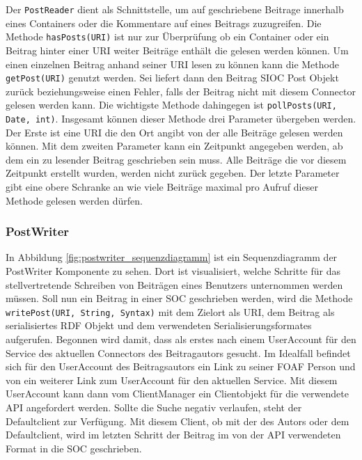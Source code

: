 Der \texttt{PostReader} dient als Schnittstelle, um auf geschriebene Beitrage innerhalb eines Containers oder die Kommentare auf eines Beitrags zuzugreifen. Die Methode \texttt{hasPosts(URI)} ist nur zur Überprüfung ob ein Container oder ein Beitrag hinter einer URI weiter Beiträge enthält die gelesen werden können. Um einen einzelnen Beitrag anhand seiner URI lesen zu können kann die Methode \texttt{getPost(URI)}  genutzt werden. Sei liefert dann den Beitrag SIOC Post Objekt zurück beziehungsweise einen Fehler, falls der Beitrag nicht mit diesem Connector gelesen werden kann. Die wichtigste Methode dahingegen ist \texttt{pollPosts(URI, Date, int)}. Insgesamt können dieser Methode drei Parameter übergeben werden. Der Erste ist eine URI die den Ort angibt von der alle Beiträge gelesen werden können. Mit dem zweiten Parameter kann ein Zeitpunkt angegeben werden, ab dem ein zu lesender Beitrag geschrieben sein muss. Alle Beiträge die vor diesem Zeitpunkt erstellt wurden, werden nicht zurück gegeben. Der letzte Parameter gibt eine obere Schranke an wie viele Beiträge maximal pro Aufruf dieser Methode gelesen werden dürfen.


\subsubsection{PostWriter} %
\label{ssub:postwriter}

In Abbildung \ref{fig:postwriter_sequenzdiagramm} ist ein Sequenzdiagramm der PostWriter Komponente zu sehen. Dort ist visualisiert, welche Schritte für das stellvertretende Schreiben von Beiträgen eines Benutzers unternommen werden müssen. Soll nun ein Beitrag in einer SOC geschrieben werden, wird die Methode \texttt{writePost(URI, String, Syntax)} mit dem Zielort als URI, dem Beitrag als serialisiertes RDF Objekt und dem verwendeten Serialisierungsformates aufgerufen. Begonnen wird damit, dass als erstes nach einem UserAccount für den Service des aktuellen Connectors des Beitragautors gesucht. Im Idealfall befindet sich für den UserAccount des Beitragsautors ein Link zu seiner FOAF Person und von ein weiterer Link zum UserAccount für den aktuellen Service. Mit diesem UserAccount kann dann vom ClientManager ein Clientobjekt für die verwendete API angefordert werden. Sollte die Suche negativ verlaufen, steht der Defaultclient zur Verfügung. Mit diesem Client, ob mit der des Autors oder dem Defaultclient, wird im letzten Schritt der Beitrag im von der API verwendeten Format in die SOC geschrieben.

